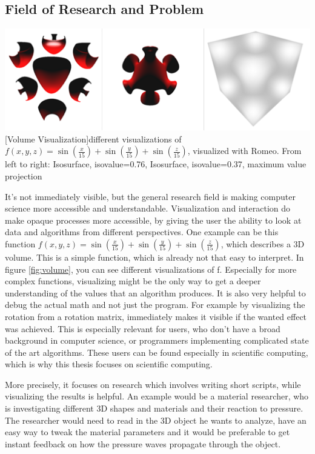 \subsection{Field of Research and Problem}
\vspace{1em}
\begin{minipage}{\linewidth}
    \centering
    \includegraphics[width=0.7\linewidth]{graphics/surfaces.png}
    [Volume Visualization]{different visualizations of $f(x,y,z)=\sin(\frac{x}{15})+\sin(\frac{y}{15})+\sin(\frac{z}{15})$, visualized with Romeo. From left to right: Isosurface, isovalue=0.76, Isosurface, isovalue=0.37, maximum value projection}
    \label{fig:volume}
\end{minipage}
It's not immediately visible, but the general research field is making computer science more accessible and understandable. 
Visualization and interaction do make opaque processes more accessible, by giving the user the ability to look at data and algorithms from different perspectives. 
One example can be this function $f(x,y,z)=\sin(\frac{x}{15})+\sin(\frac{y}{15})+\sin(\frac{z}{15})$, which describes a 3D volume. 
This is a simple function, which is already not that easy to interpret. In figure \ref{fig:volume}, you can see different visualizations of f. Especially for more complex functions, visualizing might be the only way to get a deeper understanding of the values that an algorithm produces.
It is also very helpful to debug the actual math and not just the program. For example by visualizing the rotation from a rotation matrix, immediately makes it visible if the wanted effect was achieved.
This is especially relevant for users, who don't have a broad background in computer science, or programmers implementing complicated state of the art algorithms.
These users can be found especially in scientific computing, which is why this thesis focuses on scientific computing. 

More precisely, it focuses on research which involves writing short scripts, while visualizing the results is helpful. 
An example would be a material researcher, who is investigating different 3D shapes and materials and their reaction to pressure.
The researcher would need to read in the 3D object he wants to analyze, have an easy way to tweak the material parameters and it would be preferable to get instant feedback on how the pressure waves propagate through the object.

